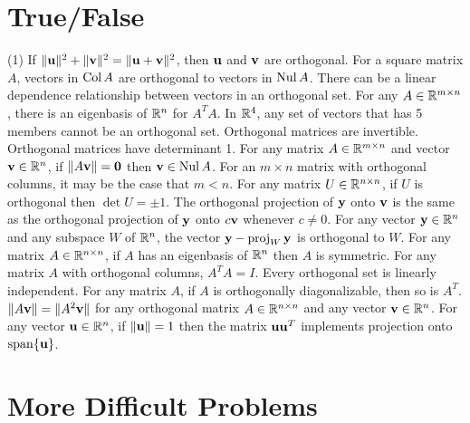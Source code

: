 \section{True/False}

\trueFalseHeader

\begin{tasks}[resume, style=enumerate](1)
\task
  If $\|\mathbf u\|^2 + \|\mathbf v\|^2 = \|\mathbf u + \mathbf v\|^2$, then $\mathbf u$ and $\mathbf v$
  are orthogonal.
\task
  For a square matrix $A$, vectors in $\operatorname{\mathrm{Col}} A$ are orthogonal to
  vectors in $\operatorname{\mathrm{Nul}} A$.
\task
  There can be a linear dependence relationship between vectors in an
  orthogonal set.
\task
  For any $A \in \mathbb R^{m \times n}$, there is an eigenbasis of $\mathbb R^n$
  for $A^TA$.
\task
  In $\mathbb R^4$, any set of vectors that has 5 members cannot be an
  orthogonal set.
\task
  Orthogonal matrices are invertible.
\task
  Orthogonal matrices have determinant 1.
\task
  For any matrix $A \in \mathbb R^{m \times n}$ and vector $\mathbf v \in \mathbb R^n$, if
  $\|A \mathbf v \| = \mathbf 0$ then $\mathbf v \in \operatorname{\mathrm{Nul}} A$.
\task
  For an $m \times n$ matrix with orthogonal columns, it may be the
  case that $m < n$.
\task
  For any matrix $U \in \mathbb {\mathbb R}^{n \times n}$, if $U$ is orthogonal
  then $\det U = \pm 1$.
\task
  The orthogonal projection of $\mathbf y$ onto $\mathbf v$ is the same as the
  orthogonal projection of $\mathbf y$ onto $c \mathbf v$ whenever $c \neq 0$.
\task
  For any vector $\mathbf y \in \mathbb R^n$ and any subspace $W$ of $\mathbb R^n$, the
  vector $\mathbf y - \operatorname{\mathrm{proj}}_W \mathbf y$ is orthogonal to $W$.
\task
  For any matrix $A \in \mathbb R^{n \times n}$, if $A$ has an eigenbasis of
  $\mathbb R^n$ then $A$ is symmetric.
\task
  For any matrix $A$ with orthogonal columns, $A^TA = I$.
\task
  Every orthogonal set is linearly independent.
\task
  For any matrix $A$, if $A$ is orthogonally diagonalizable, then so
  is $A^T$.
\task
  $\|A \mathbf v \| = \| A^2 \mathbf v \|$ for any orthogonal matrix $A \in \mathbb R^{n
  \times n}$ and any vector $\mathbf v \in \mathbb R^n$.
\task
  For any vector $\mathbf u \in \mathbb R^n$, if $\|\mathbf u\| = 1$ then the matrix $\mathbf u
  \mathbf u^T$ implements projection onto $\operatorname{\mathrm{span}}\{\mathbf u\}$.
\end{tasks}

\section{More Difficult Problems}

